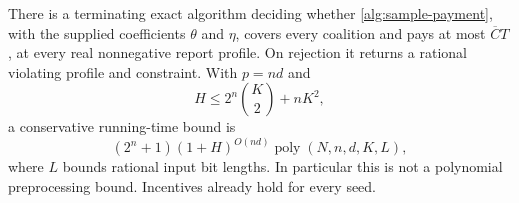 \begin{theorem}
\label{alg:certification}
There is a terminating exact algorithm deciding whether
\eqref{alg:sample-payment}, with the supplied coefficients $\theta$ and $\eta$,
covers every coalition and pays at most
$\overline C T$, at every real nonnegative report profile.
On rejection it returns a rational violating profile and constraint.
With $p=nd$ and
\[
 H\le 2^n\binom K2+nK^2,
\]
a conservative running-time bound is
\begin{equation}\label{alg:cert-cost}
 (2^n+1)(1+H)^{O(nd)}\operatorname{poly}(N,n,d,K,L),
\end{equation}
where $L$ bounds rational input bit lengths.  In particular this is not a
polynomial preprocessing bound.  Incentives already hold for every seed.
\end{theorem}
